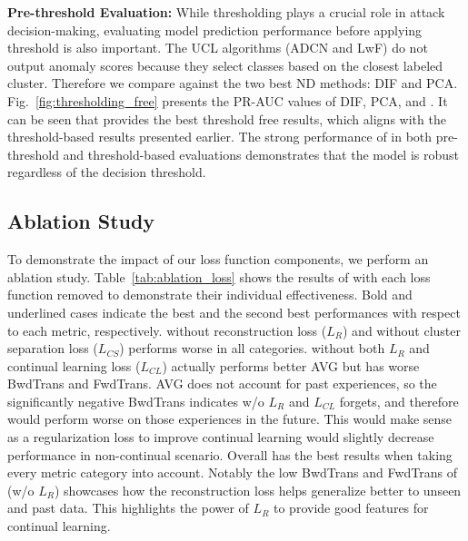 
\textbf{Pre-threshold Evaluation:} While thresholding plays a crucial role in attack decision-making, evaluating model prediction performance before applying threshold is also important. The UCL algorithms (ADCN\cite{ashfahani2023unsupervised} and LwF\cite{lwf2019Li}) do not output anomaly scores because they select classes based on the closest labeled cluster. Therefore we compare against the two best ND methods: DIF\cite{xu2023deep} and PCA\cite{rios2022incdfm}. Fig.~\ref{fig:thresholding_free} presents the PR-AUC values of DIF, PCA, and \Design{}. It can be seen that \Design{} provides the best threshold free results, which aligns with the threshold-based results presented earlier. The strong performance of \Design{} in both pre-threshold and threshold-based evaluations demonstrates that the model is robust regardless of the decision threshold. 

\subsection{Ablation Study}

To demonstrate the impact of our loss function components, we perform an ablation study. Table~\ref{tab:ablation_loss} shows the results of \Design{} with each loss function removed to demonstrate their individual effectiveness. Bold and underlined cases indicate the best and the second best performances with respect to each metric, respectively. \Design{} without reconstruction loss ($L_R$) and \Design{} without cluster separation loss ($L_{CS}$) performs worse in all categories. \Design{} without both $L_R$ and continual learning loss ($L_{CL}$) actually performs better AVG but has worse BwdTrans and FwdTrans. AVG does not account for past experiences, so the significantly negative BwdTrans indicates \Design{} w/o $L_R$ and $L_{CL}$ forgets, and therefore would perform worse on those experiences in the future. This would make sense as a regularization loss to improve continual learning would slightly decrease performance in non-continual scenario. Overall \Design{} has the best results when taking every metric category into account. Notably the low BwdTrans and FwdTrans of \Design{} (w/o $L_R$) showcases how the reconstruction loss helps \Design{} generalize better to unseen and past data. This highlights the power of $L_R$ to provide good features for continual learning. 

